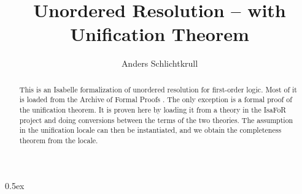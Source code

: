 \documentclass[11pt,a4paper]{article}
\begin{document}
\title{Unordered Resolution -- with Unification Theorem}
\author{Anders Schlichtkrull}
\maketitle
\begin{abstract}
This is an Isabelle formalization of unordered resolution for first-order logic. Most of it is loaded from the Archive of Formal Proofs \cite{afp}. The only exception is a formal proof of the unification theorem. It is proven here by loading it from a theory in the IsaFoR project \cite{isafor} and doing conversions between the terms of the two theories. The assumption in the unification locale can then be instantiated, and we obtain the completeness theorem from the locale.
\end{abstract}

\tableofcontents

\parindent 0pt\parskip 0.5ex





\end{document}
